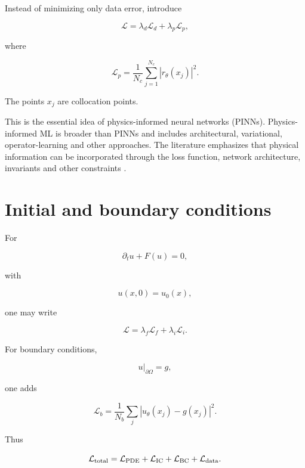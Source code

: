 \documentclass[11pt,a4paper,oneside]{book}
\newcommand{\Loss}{\mathcal{L}}
\begin{document}
Instead of minimizing only data error, introduce

\begin{equation}
\Loss
=
\lambda_d\Loss_d
+
\lambda_p\Loss_p,
\end{equation}

where

\begin{equation}
\Loss_p
=
\frac{1}{N_c}
\sum_{j=1}^{N_c}
|r_\theta(x_j)|^2.
\end{equation}

The points $x_j$ are collocation points.

This is the essential idea of physics-informed neural networks (PINNs).
Physics-informed ML is broader than PINNs and includes architectural,
variational, operator-learning and other approaches. The literature emphasizes
that physical information can be incorporated through the loss function,
network architecture, invariants and other constraints
\citep{Raissi2019,Karniadakis2021}.

\section{Initial and boundary conditions}

For

\begin{equation}
\partial_tu+F(u)=0,
\end{equation}

with

\begin{equation}
u(x,0)=u_0(x),
\end{equation}

one may write

\begin{equation}
\Loss
=
\lambda_f\Loss_f
+
\lambda_i\Loss_i.
\end{equation}

For boundary conditions,

\begin{equation}
u|_{\partial\Omega}=g,
\end{equation}

one adds

\begin{equation}
\Loss_b
=
\frac{1}{N_b}
\sum_j
|u_\theta(x_j)-g(x_j)|^2.
\end{equation}

Thus

\begin{equation}
\Loss_{\rm total}
=
\Loss_{\rm PDE}
+
\Loss_{\rm IC}
+
\Loss_{\rm BC}
+
\Loss_{\rm data}.
\end{equation}
\end{document}
